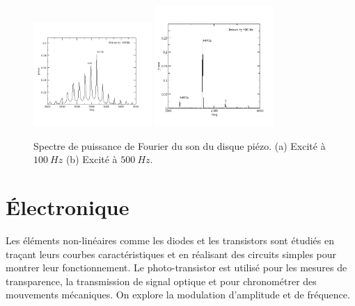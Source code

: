 \documentclass{book}
\begin{document}
\begin{figure}[h!]
\begin{center}
\caption{\label{fig:Piezo-Fourier-spectrum}Spectre de puissance de Fourier du son du disque piézo. (a) Excité à $100\ Hz$ (b) Excité à $500\ Hz$. }\vspace{0.5em}
\includegraphics[width=0.4\textwidth, height=0.3\textwidth, keepaspectratio]{Schematic-piezo-fft-100hz.png}
\includegraphics[width=0.4\textwidth, height=0.3\textwidth, keepaspectratio]{Pic-piezo-fft-500hz.png}
\end{center}
\end{figure}










\chapter{Électronique}


Les éléments non-linéaires comme les diodes et les transistors sont étudiés en traçant leurs courbes caractéristiques et en réalisant des circuits simples pour montrer leur fonctionnement. Le photo-transistor est utilisé pour les mesures de transparence, la transmission de signal optique et pour chronométrer des mouvements mécaniques. On explore la modulation d'amplitude et de fréquence.



\end{document}
